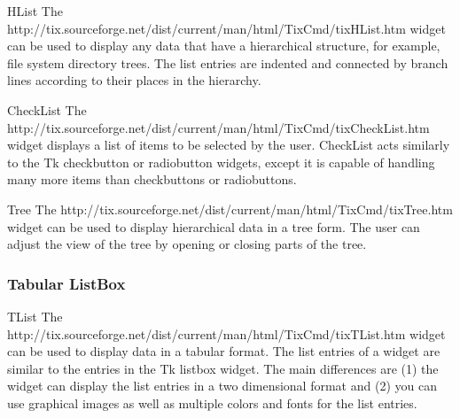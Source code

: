 \begin{classdesc}{HList}{}
The 
{http://tix.sourceforge.net/dist/current/man/html/TixCmd/tixHList.htm}
widget can be used to display any data that have a hierarchical
structure, for example, file system directory trees. The list entries
are indented and connected by branch lines according to their places
in the hierarchy.
\end{classdesc}


\begin{classdesc}{CheckList}{}
The 
{http://tix.sourceforge.net/dist/current/man/html/TixCmd/tixCheckList.htm}
widget displays a list of items to be selected by the user. CheckList
acts similarly to the Tk checkbutton or radiobutton widgets, except it
is capable of handling many more items than checkbuttons or
radiobuttons.
\end{classdesc}


\begin{classdesc}{Tree}{}
The 
{http://tix.sourceforge.net/dist/current/man/html/TixCmd/tixTree.htm}
widget can be used to display hierarchical data in a tree form. The
user can adjust the view of the tree by opening or closing parts of
the tree.
\end{classdesc}




\subsubsection{Tabular ListBox}

\begin{classdesc}{TList}{}
The 
{http://tix.sourceforge.net/dist/current/man/html/TixCmd/tixTList.htm}
widget can be used to display data in a tabular format. The list
entries of a  widget are similar to the entries in the Tk
listbox widget.  The main differences are (1) the  widget
can display the list entries in a two dimensional format and (2) you
can use graphical images as well as multiple colors and fonts for the
list entries.
\end{classdesc}

